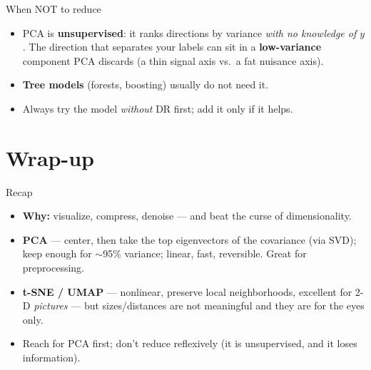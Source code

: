 \documentclass[aspectratio=169]{beamer}
\begin{document}
\begin{frame}{When NOT to reduce}
  \begin{itemize}\small
    \item PCA is \textbf{unsupervised}: it ranks directions by variance \emph{with no knowledge of
      $y$}. The direction that separates your labels can sit in a \textbf{low-variance} component PCA
      discards (a thin signal axis vs.\ a fat nuisance axis).
    \item \textbf{Tree models} (forests, boosting) usually do not need it.
    \item Always try the model \emph{without} DR first; add it only if it helps.
  \end{itemize}
\end{frame}

\section*{Wrap-up}

\begin{frame}{Recap}
  \begin{itemize}\small
    \item \textbf{Why:} visualize, compress, denoise --- and beat the curse of dimensionality.
    \item \textbf{PCA} --- center, then take the top eigenvectors of the covariance (via SVD);
      keep enough for $\sim$95\% variance; linear, fast, reversible. Great for preprocessing.
    \item \textbf{t-SNE / UMAP} --- nonlinear, preserve local neighborhoods, excellent for 2-D
      \emph{pictures} --- but sizes/distances are not meaningful and they are for the eyes only.
    \item Reach for PCA first; don't reduce reflexively (it is unsupervised, and it loses information).
  \end{itemize}
  \vfill
\end{frame}
\end{document}
